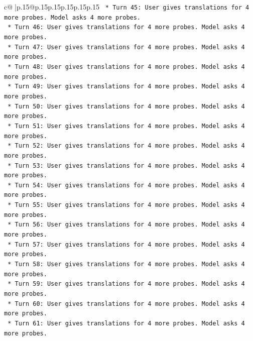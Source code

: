 \documentclass{article}
\begin{document}
{\begin{supertabular}{c@{$\;$}|p{.15\linewidth}@{}p{.15\linewidth}p{.15\linewidth}p{.15\linewidth}p{.15\linewidth}p{.15\linewidth}}
{{{\texttt{                    *   Turn 45: User gives translations for 4 more probes. Model asks 4 more probes.} \\
\texttt{                    *   Turn 46: User gives translations for 4 more probes. Model asks 4 more probes.} \\
\texttt{                    *   Turn 47: User gives translations for 4 more probes. Model asks 4 more probes.} \\
\texttt{                    *   Turn 48: User gives translations for 4 more probes. Model asks 4 more probes.} \\
\texttt{                    *   Turn 49: User gives translations for 4 more probes. Model asks 4 more probes.} \\
\texttt{                    *   Turn 50: User gives translations for 4 more probes. Model asks 4 more probes.} \\
\texttt{                    *   Turn 51: User gives translations for 4 more probes. Model asks 4 more probes.} \\
\texttt{                    *   Turn 52: User gives translations for 4 more probes. Model asks 4 more probes.} \\
\texttt{                    *   Turn 53: User gives translations for 4 more probes. Model asks 4 more probes.} \\
\texttt{                    *   Turn 54: User gives translations for 4 more probes. Model asks 4 more probes.} \\
\texttt{                    *   Turn 55: User gives translations for 4 more probes. Model asks 4 more probes.} \\
\texttt{                    *   Turn 56: User gives translations for 4 more probes. Model asks 4 more probes.} \\
\texttt{                    *   Turn 57: User gives translations for 4 more probes. Model asks 4 more probes.} \\
\texttt{                    *   Turn 58: User gives translations for 4 more probes. Model asks 4 more probes.} \\
\texttt{                    *   Turn 59: User gives translations for 4 more probes. Model asks 4 more probes.} \\
\texttt{                    *   Turn 60: User gives translations for 4 more probes. Model asks 4 more probes.} \\
\texttt{                    *   Turn 61: User gives translations for 4 more probes. Model asks 4 more probes.} \\
}}}
\end{supertabular}}
\end{document}
